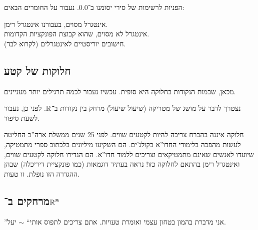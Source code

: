 \documentclass[]{../../../../tex/classes/styledArticle}
\begin{document}
	הפניות לרשימות של סירי יסומנו ב־0.0\shiri\!. נעבור על החומרים הבאים: 
	
	 אינטגרל מסוים, בעבורנו אינטגרל רימן. \\
	 אינטגרל לא מסוים, שהוא קבוצת הפונקציות הקדומות. \\
	 חישובים יוריסטיים לאינטגרלים (לקרוא לבד). 
	
	\subsection*{חלוקות של קטע}
	מכאן, שכמות הנקודות בחלוקה היא {סופית}. 
	\prooftrivial
	עכשיו נעבור לכמה תרגילים יותר מעניינים. 
	
	נצטרך לדבר על מושג של מטריקה (שיעול שיעול) מרחק בין נקודות ב־$\mathbb{R}$. לפני כן, נעבור לשעת סיפור. 
	
	חלוקה איננה בהכרח צריכה להיות לקטעים שווים. 
	לפני 25 שנים ממשלת ארה''ב החליטה לעשות מהפכה בלימודי החדו''א בקולג'ים. הם השקיעו מיליונים בלכתוב ספרי מתמטיקה, שיועדו לאנשים שאינם מתמטיקאים וצריכים ללמוד חדו''א. הם הגדירו חלוקה לקטעים שווים, ואינטגרל רימן בהתאם לחלוקה כזו! נראה בעתיד דוגמאות (כמו פונקציית דיריכלה) שבהן ההגדרה הזו נופלת. זו טעות. 
	
	\subsection*{מרחקים ב־$\bm{\mathbb{R}^{n}}$}
	
	''אני מדברת בהמון בטחון עצמי ואומרת טעויות. אתם צריכים לתפוס אותי`` $\sim$ יעל. 
	
\end{document}
